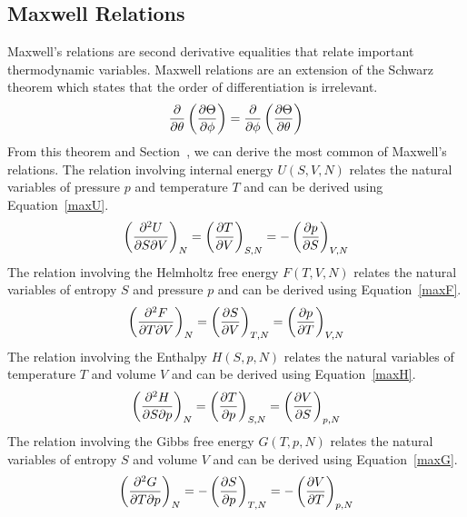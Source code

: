 \subsection{Maxwell Relations}\label{maxwell}
Maxwell's relations are second derivative equalities that relate important thermodynamic variables. Maxwell relations are an extension of the Schwarz theorem which states that the order of differentiation is irrelevant.
\begin{align}
    \pdv{}{\theta}\left(\pdv{\Theta}{\phi}\right)=\pdv{}{\phi}\left(\pdv{\Theta}{\theta}\right)
\end{align}
From this theorem and Section~, we can derive the most common of Maxwell's relations. The relation involving internal energy $U\left(S,V,N\right)$ relates the natural variables of pressure $p$ and temperature $T$ and can be derived using Equation~\ref{maxU}.
\begin{align}
    \left( {\pdv{U}{S}{V}} \right )_{N} = \left( \pdv{T}{V}\right )_{S,N} = - \left( \pdv{p}{S}\right )_{V,N}
\end{align}
The relation involving the Helmholtz free energy $F\left(T,V,N\right)$ relates the natural variables of entropy $S$ and pressure $p$ and can be derived using Equation~\ref{maxF}.
\begin{align}
    \left( {\pdv{F}{T}{V}} \right )_{N} = \left( \pdv{S}{V}\right )_{T,N} = \left( \pdv{p}{T}\right )_{V,N}
\end{align}
The relation involving the Enthalpy $H\left(S,p,N\right)$ relates the natural variables of temperature $T$ and volume $V$ and can be derived using Equation~\ref{maxH}.
\begin{align}
    \left( {\pdv{H}{S}{p}} \right )_{N} = \left( \pdv{T}{p}\right )_{S,N} =  \left( \pdv{V}{S}\right )_{p,N}
\end{align}
The relation involving the Gibbs free energy $G\left(T,p,N\right)$ relates the natural variables of entropy $S$ and volume $V$ and can be derived using Equation~\ref{maxG}.
\begin{align}
    \left( {\pdv{G}{T}{p}} \right )_{N} = -\left( \pdv{S}{p}\right )_{T,N} = - \left( \pdv{V}{T}\right )_{p,N}
\end{align}

